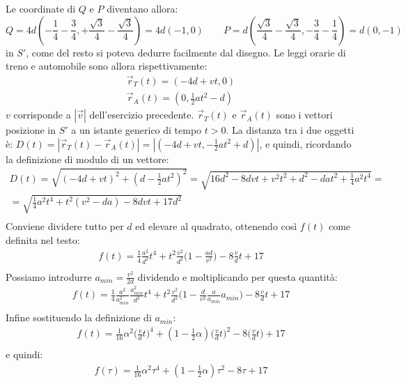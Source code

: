 \documentclass[12pt,a4paper]{book}
\begin{document}
Le coordinate di $Q$ e $P$ diventano allora:
%
\begin{equation*}
Q=4d(-\frac{1}{4}-\frac{3}{4}, +\frac{\sqrt{3}}{4}-\frac{\sqrt{3}}{4})=4d(-1,0) \qquad P=d(\frac{\sqrt{3}}{4}-\frac{\sqrt{3}}{4}, -\frac{3}{4}-\frac{1}{4})=d(0,-1)
\end{equation*}
%
in $S'$, come del resto si poteva dedurre facilmente dal disegno. Le leggi orarie di treno e automobile sono allora rispettivamente:
%
\begin{gather*}
\vec{r}_T(t)=(-4d+vt,0)  \\
\vec{r}_A(t)=(0,\frac{1}{2}at^2 -d) 
\end{gather*}
%
$v$ corrisponde a $|\vec{v}|$ dell'esercizio precedente. $\vec{r}_T(t)$ e $\vec{r}_A(t)$ sono i vettori posizione 
in $S'$ a un istante generico di tempo $t>0$. La distanza tra i due oggetti è: $D(t)=|\vec{r}_T(t) - \vec{r}_A(t)|=|(-4d+vt, -\frac{1}{2}at^2 +d)|$, e quindi, ricordando la definizione di modulo di un vettore:
%
\begin{gather*}
D(t)=\sqrt{(-4d+vt)^2 + (d-\frac{1}{2}at^2)^2} =\sqrt{16d^2 -8dvt +v^2t^2 + d^2 - dat^2+\frac{1}{4}a^2t^4} = \\
=\sqrt{\frac{1}{4}a^2t^4+t^2(v^2-da)-8dvt+17d^2}\\
\end{gather*}
%
Conviene dividere tutto per $d$ ed elevare al quadrato, ottenendo così $f(t)$ come definita nel testo:
%
\begin{gather*}
f(t)=\frac{1}{4}\frac{a^2}{d^2}t^4+t^2\frac{v^2}{d^2}\big(1-\frac{ad}{v^2}\big)-8\frac{v}{d}t+17\\
\end{gather*}
%
Possiamo introdurre $a_{min}=\frac{v^2}{2d}$ dividendo e moltiplicando per questa quantità:
%
\begin{gather*}
f(t)=\frac{1}{4}\frac{a^2}{a_{min}^2}\frac{a_{min}^2}{d^2}t^4+t^2\frac{v^2}{d^2}\big(1-\frac{d}{v^2}\frac{a}{a_{min}}a_{min}\big)-8\frac{v}{d}t+17\\
\end{gather*}
%
Infine sostituendo la definizione di $a_{min}$:
%
\begin{gather*}
f(t)=\frac{1}{16}\alpha^2 \big(\frac{v}{d}t\big)^4+(1-\frac{1}{2}\alpha)\big(\frac{v}{d}t\big)^2-8\big(\frac{v}{d}t\big)+17\\
\end{gather*}
%
e quindi:
%
\begin{gather*}
f(\tau)=\frac{1}{16}\alpha^2 \tau^4+(1-\frac{1}{2}\alpha)\tau^2-8\tau+17
\end{gather*}
\end{document}

